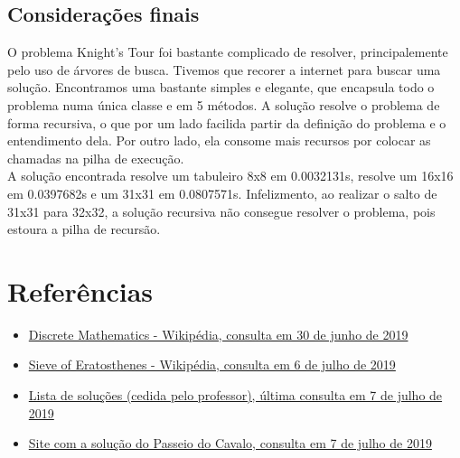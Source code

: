 \documentclass{article}
\begin{document}
    \subsection{Considerações finais}
    O problema Knight's Tour foi bastante complicado de resolver, principalemente pelo uso de árvores de busca. Tivemos que recorer a internet para buscar uma solução. Encontramos uma bastante simples e elegante, que encapsula todo o problema numa única classe e em 5 métodos. A solução resolve o problema de forma recursiva, o que por um lado facilida partir da definição do problema e o entendimento dela. Por outro lado, ela consome mais recursos por colocar as chamadas na pilha de execução.\\
    A solução encontrada resolve um tabuleiro 8x8 em 0.0032131s, resolve um 16x16 em 0.0397682s e um 31x31 em 0.0807571s. Infelizmento, ao realizar o salto de 31x31 para 32x32, a solução recursiva não consegue resolver o problema, pois estoura a pilha de recursão.
\clearpage

\section{Referências}
    \begin{itemize}
      \item \href{https://en.wikipedia.org/wiki/Discrete_mathematics}{Discrete Mathematics - Wikipédia, consulta em 30 de junho de 2019}
      \item \href{https://en.wikipedia.org/wiki/Sieve_of_Eratosthenes}{Sieve of Eratosthenes - Wikipédia, consulta em 6 de julho de 2019}
      \item \href{https://github.com/nayuki/Project-Euler-solutions/blob/master/Answers.txt}{Lista de soluções (cedida pelo professor), última consulta em 7 de julho de 2019}
      \item \href{http://blog.justsophie.com/algorithm-for-knights-tour-in-python/}{Site com a solução do Passeio do Cavalo, consulta em 7 de julho de 2019}
    \end{itemize}
\end{document}
